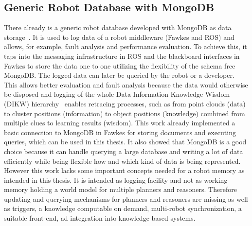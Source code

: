 \documentclass[a4paper,11pt]{article}
\begin{document}
\subsection{Generic Robot Database with MongoDB}
\label{sec:mongo-logging}
There already is a generic robot database developed with MongoDB as
data storage~\cite{RoboDB}. It is used to log data of a
robot middleware (Fawkes and ROS) and allows, for example, fault analysis and performance
evaluation. To achieve this, it taps into the messaging infrastructure
in ROS and the blackboard interfaces in Fawkes to store the data one
to one utilizing the flexibility of the schema free MongoDB. The
logged data can later be queried by the robot or a developer. This
allows better evaluation and fault analysis because the data would
otherwise be disposed and logging of the whole
Data-Information-Knowledge-Wisdom (DIKW) hierarchy~\cite{DIKW} enables
retracing processes, such as from point clouds (data) to cluster
positions (information) to object positions (knowledge) combined from
multiple clues to learning results (wisdom). This work already
implemented a basic connection to MongoDB in Fawkes for storing
documents and executing queries, which can be used in this thesis. It
also showed that MongoDB is a good choice because it can handle
querying a large database and writing a lot of data efficiently while
being flexible how and which kind of data is being represented.
However this work lacks some important concepts needed for a robot
memory as intended in this thesis. It is intended as logging facility
and not as working memory holding a world model for multiple planners
and reasoners. Therefore updating and querying mechanisms for planners
and reasoners are missing as well as triggers, a knowledge computable
on demand, multi-robot synchronization, a suitable front-end, ad
integration into knowledge based systems.
\end{document}
